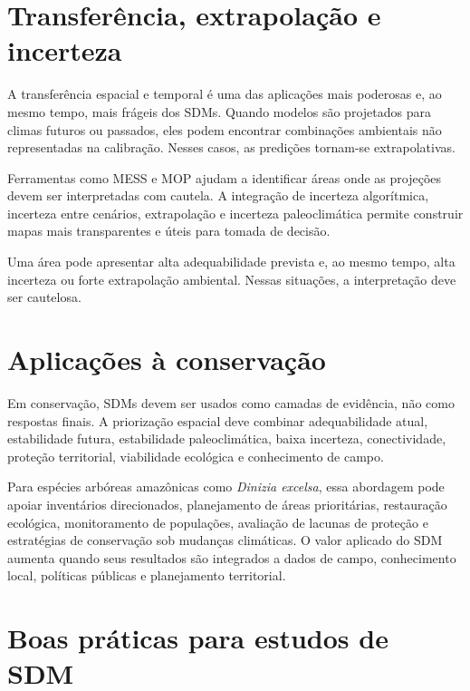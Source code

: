 \documentclass{ueap-sdm}
\begin{document}
\section{Transferência, extrapolação e incerteza}

A transferência espacial e temporal é uma das aplicações mais poderosas e, ao mesmo tempo, mais frágeis dos SDMs. Quando modelos são projetados para climas futuros ou passados, eles podem encontrar combinações ambientais não representadas na calibração. Nesses casos, as predições tornam-se extrapolativas.

Ferramentas como MESS e MOP ajudam a identificar áreas onde as projeções devem ser interpretadas com cautela. A integração de incerteza algorítmica, incerteza entre cenários, extrapolação e incerteza paleoclimática permite construir mapas mais transparentes e úteis para tomada de decisão.

\begin{atencao}[title={\faExclamationTriangle\quad Alta adequabilidade não significa alta confiança}]
	Uma área pode apresentar alta adequabilidade prevista e, ao mesmo tempo, alta incerteza ou forte extrapolação ambiental. Nessas situações, a interpretação deve ser cautelosa.
\end{atencao}

\section{Aplicações à conservação}

Em conservação, SDMs devem ser usados como camadas de evidência, não como respostas finais. A priorização espacial deve combinar adequabilidade atual, estabilidade futura, estabilidade paleoclimática, baixa incerteza, conectividade, proteção territorial, viabilidade ecológica e conhecimento de campo.

Para espécies arbóreas amazônicas como \textit{Dinizia excelsa}, essa abordagem pode apoiar inventários direcionados, planejamento de áreas prioritárias, restauração ecológica, monitoramento de populações, avaliação de lacunas de proteção e estratégias de conservação sob mudanças climáticas. O valor aplicado do SDM aumenta quando seus resultados são integrados a dados de campo, conhecimento local, políticas públicas e planejamento territorial.

\section{Boas práticas para estudos de SDM}
\end{document}
